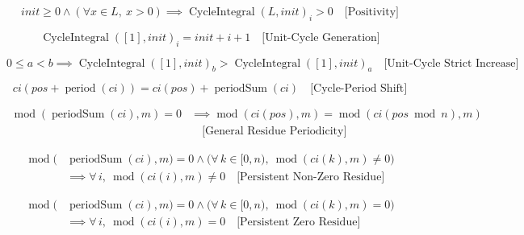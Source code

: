 \begin{equation*}
init \geq 0 \land (\forall x \in L,\ x > 0)
\implies
\operatorname{CycleIntegral}(L, init)_i > 0
\quad \text{[Positivity]}
\end{equation*}

\begin{equation*}
\operatorname{CycleIntegral}([1], init)_i
= init + i + 1
\quad \text{[Unit-Cycle Generation]}
\end{equation*}

\begin{equation*}
0 \leq a < b \implies
\operatorname{CycleIntegral}([1], init)_b
> \operatorname{CycleIntegral}([1], init)_a
\quad \text{[Unit-Cycle Strict Increase]}
\end{equation*}

\begin{equation*}
ci(pos + \operatorname{period}(ci))
= ci(pos) + \operatorname{periodSum}(ci)
\quad \text{[Cycle-Period Shift]}
\end{equation*}

\begin{equation*}
\begin{aligned}
\operatorname{mod}(\operatorname{periodSum}(ci), m) = 0
&\implies
\operatorname{mod}(ci(pos), m) = \operatorname{mod}(ci(pos \bmod n), m) \\
&\quad \text{[General Residue Periodicity]}
\end{aligned}
\end{equation*}

\begin{equation*}
\begin{aligned}
\operatorname{mod}(&\operatorname{periodSum}(ci), m) = 0 \land \big(\forall\, k \in [0,n),\ \operatorname{mod}(ci(k), m) \neq 0\big) \\
&\implies
\forall\, i,\ \operatorname{mod}(ci(i), m) \neq 0
\quad \text{[Persistent Non-Zero Residue]}
\end{aligned}
\end{equation*}

\begin{equation*}
\begin{aligned}
\operatorname{mod}(&\operatorname{periodSum}(ci), m) = 0 \land \big(\forall\, k \in [0,n),\ \operatorname{mod}(ci(k), m) = 0\big) \\
&\implies
\forall\, i,\ \operatorname{mod}(ci(i), m) = 0
\quad \text{[Persistent Zero Residue]}
\end{aligned}
\end{equation*}

